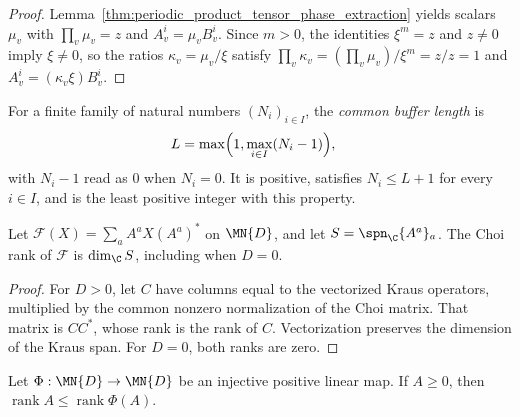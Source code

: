 \begin{proof}
    \leanok
    Lemma~\ref{thm:periodic_product_tensor_phase_extraction} yields
    scalars $\mu_v$ with $\prod_v\mu_v=z$ and $A_v^i=\mu_vB_v^i$. Since
    $m>0$, the identities $\xi^m=z$ and $z\ne0$ imply $\xi\ne0$, so the
    ratios $\kappa_v=\mu_v/\xi$ satisfy
    $\prod_v\kappa_v=(\prod_v\mu_v)/\xi^m=z/z=1$ and
    $A_v^i=(\kappa_v\xi)B_v^i$.
\end{proof}

\begin{definition}
    \label{def:common_buffer_length}
    \leanok
    For a finite family of natural numbers $(N_i)_{i\in I}$, the
    \emph{common buffer length} is
    \begin{align}
        L & =\max\Bigl(1,\max_{i\in I}(N_i-1)\Bigr),
        \label{eq:common_buffer_length}
    \end{align}
    with $N_i-1$ read as $0$ when $N_i=0$.  It is positive, satisfies
    $N_i\leq L+1$ for every $i\in I$, and is the least positive integer with
    this property.
\end{definition}

\begin{lemma}
    \label{thm:periodic_choi_rank_kraus_span}
    \leanok
    Let $\mathcal F(X)=\sum_a A^aX(A^a)^*$ on $\MN{D}$, and let
    $S=\spn_{\C}\{A^a\}_a$. The Choi rank of $\mathcal F$ is
    $\dim_{\C}S$, including when $D=0$.
\end{lemma}

\begin{proof}
    \leanok
    For $D>0$, let $C$ have columns equal to the vectorized Kraus operators,
    multiplied by the common nonzero normalization of the Choi matrix. That
    matrix is $CC^*$, whose rank is the rank of $C$. Vectorization preserves
    the dimension of the Kraus span. For $D=0$, both ranks are zero.
\end{proof}

\begin{lemma}
    \label{thm:periodic_injective_positive_rank}
    \leanok
    Let $\Phi:\MN{D}\to\MN{D}$ be an injective positive linear map.
    If $A\ge0$, then $\operatorname{rank}A\le\operatorname{rank}\Phi(A)$.
\end{lemma}

